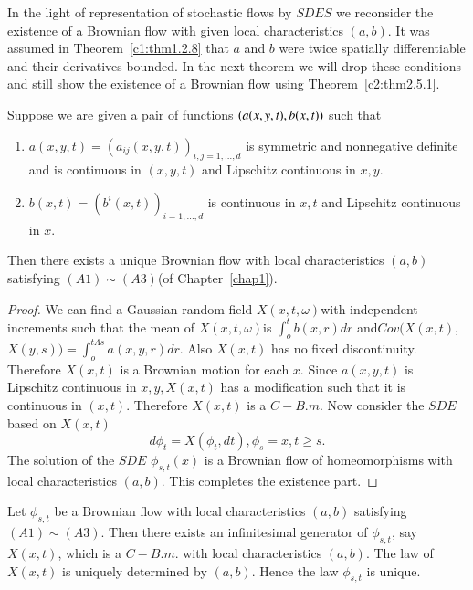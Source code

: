 In the light of representation of stochastic flows by $SDES$ we
reconsider the existence of a Brownian flow with given local
characteristics $(a, b)$. It was assumed in Theorem~\ref{c1:thm1.2.8} that $a$
and $b$ were twice spatially differentiable and their derivatives
bounded. In the next theorem we will drop these conditions and still
show the existence of a Brownian flow using Theorem~\ref{c2:thm2.5.1}. 

\setcounter{theorem}{3}
\begin{theorem}\label{c2:thm2.5.4}%
  Suppose we are given a pair of functions $(a(x,y,t),\break b(x,t))$ such that
  \begin{enumerate}[\rm (i)]
  \item $a(x,y,t)=(a_{ij}(x,y,t))_{i,j=1,\ldots,d}$ is
    symmetric and nonnegative definite and is continuous in $(x,y,t)$
    and Lipschitz continuous in $x,y$. 
  \item\pageoriginale $b(x,t)=(b^i(x,t))_{i=1,\ldots,d}$ is continuous in
    $x,t$ and Lipschitz continuous in $x$. 
  \end{enumerate}
  Then there exists a unique Brownian flow with local characteristics
  $(a,b)$ satisfying $(A1)\sim(A3)$(of Chapter~\ref{chap1}). 
\end{theorem}

\begin{proof}
  We can find a Gaussian random field $X(x,t, \omega)$with independent
  increments such that the mean of $X(x,t,\omega)$is $\int^t_o
  b(x,r)dr$ and\break $Cov(X(x,t)$, $X(y,s))=\int^{t \Lambda
    s}_{o}a(x,y,r)dr$. 
  Also $X(x,t)$ has no fixed discontinuity. Therefore $X(x,t)$ is a
  Brownian motion for each $x$. Since $a(x,y,t)$ is Lipschitz continuous
  in $x,y,X(x,t)$ has a modification such that it is continuous in
  $(x,t)$. Therefore $X(x,t)$ is a $C-B.m$. Now consider the $SDE$ based
  on $X(x,t)$ 
  $$
  d \phi_t =X(\phi_t,dt),\phi_s =x, t \geq s.
  $$
  The solution of the $SDE$ $\phi_{s,t}(x)$ is a Brownian flow of
  homeomorphisms with local characteristics $(a,b)$. This completes the
  existence part. 
\end{proof}

\medskip
{}
  Let $\phi_{s,t}$ be a Brownian flow with local characteristics
  $(a,b)$ satisfying $(A1)\sim (A3)$. Then there exists an
  infinitesimal generator of $\phi_{s,t}$, say $X(x,t)$, which is a
  $C-B.m$. with local characteristics $(a,b)$. The law of $X(x,t)$ is
  uniquely determined by $(a,b)$. Hence the law $\phi_{s,t}$ is
  unique. 
 
